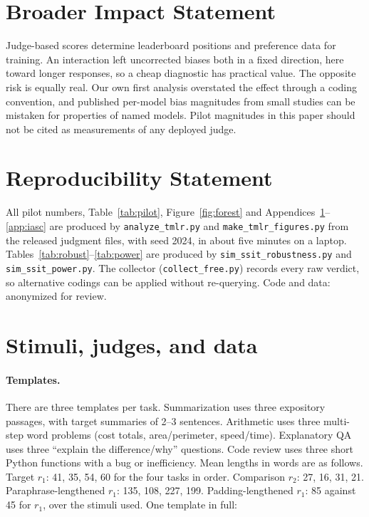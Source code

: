 \documentclass[10pt]{article}
\theoremstyle{remark}
\begin{document}
\section*{Broader Impact Statement}
Judge-based scores determine leaderboard positions and preference data
for training. An interaction left uncorrected biases both in a fixed
direction, here toward longer responses, so a cheap diagnostic has
practical value. The opposite risk is equally real. Our own first
analysis overstated the effect through a coding convention, and
published per-model bias magnitudes from small studies can be mistaken
for properties of named models. Pilot magnitudes in this paper should
not be cited as measurements of any deployed judge.

\section*{Reproducibility Statement}
All pilot numbers, Table~\ref{tab:pilot}, Figure~\ref{fig:forest} and
Appendices~\ref{app:data}--\ref{app:iasc} are produced by
\texttt{analyze\_tmlr.py} and \texttt{make\_tmlr\_figures.py} from the
released judgment files, with seed 2024, in about five minutes on a
laptop. Tables~\ref{tab:robust}--\ref{tab:power} are produced by
\texttt{sim\_ssit\_robustness.py} and \texttt{sim\_ssit\_power.py}. The
collector (\texttt{collect\_free.py}) records every raw verdict, so
alternative codings can be applied without re-querying. Code and data:
anonymized for review.




\appendix

\section{Stimuli, judges, and data}
\label{app:data}

\paragraph{Templates.}
There are three templates per task. Summarization uses three
expository passages, with target summaries of 2--3 sentences.
Arithmetic uses three multi-step word problems (cost totals,
area/perimeter, speed/time). Explanatory QA uses three ``explain the
difference/why'' questions. Code review uses three short Python
functions with a bug or inefficiency. Mean lengths in words are as
follows. Target $r_1$: 41, 35, 54, 60 for the four tasks in order.
Comparison $r_2$: 27, 16, 31, 21. Paraphrase-lengthened $r_1$: 135,
108, 227, 199. Padding-lengthened $r_1$: 85 against 45 for $r_1$, over
the stimuli used. One template in full:
\end{document}
